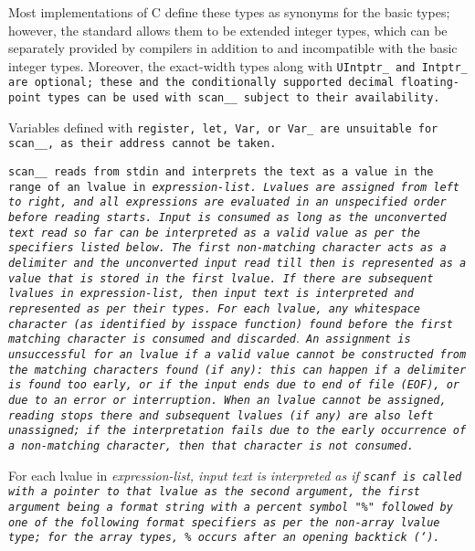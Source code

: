 Most implementations of C define these types as synonyms for the basic types;
however, the standard allows them to be extended integer types,
which can be separately provided by compilers in addition
to and incompatible with the basic integer types.
Moreover, the exact-width types along with \tt{UIntptr_} and \tt{Intptr_}
are optional; these and the conditionally supported decimal floating-point
types can be used with \tt{scan__} subject to their availability.

Variables defined with \tt{register}, \tt{let}, \tt{Var}, or \tt{Var_}
are unsuitable for \tt{scan__}, as their address cannot be taken.


\tt{scan__} reads from \tt{stdin} and interprets the text
as a value in the range of an lvalue in \it{expression-list}.
Lvalues are assigned from left to right, and all expressions
are evaluated in an unspecified order before reading starts.
Input is consumed as long as the unconverted text read so far can
be interpreted as a valid value as per the specifiers listed below.
The first non-matching character acts as a delimiter and the unconverted input
read till then is represented as a value that is stored in the first lvalue.
If there are subsequent lvalues in \it{expression-list},
then input text is interpreted and represented as per their types.
For each lvalue, any whitespace character (as identified by \tt{isspace}
function) found before the first matching character is consumed and discarded$.$
An assignment is unsuccessful for an lvalue if a valid value
cannot be constructed from the matching characters found (if any):
this can happen if a delimiter is found too early, or if the input
ends due to end of file (\tt{EOF}), or due to an error or interruption.
When an lvalue cannot be assigned, reading stops there and subsequent lvalues
(if any) are also left unassigned; if the interpretation fails due to the early
occurrence of a non-matching character, then that character is not consumed.

For each lvalue in \it{expression-list}, input text is interpreted as if
\tt{scanf} is called with a pointer to that lvalue as the second argument,
the first argument being a format string with a percent symbol \tt{"\%"}
followed by one of the following format specifiers as per the non-array lvalue
type; for the array types, \tt{\%} occurs after an opening backtick (\tt{`}).\\

